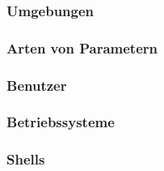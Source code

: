 \subsubsection{Umgebungen}
\subsubsection{Arten von Parametern}
\subsubsection{Benutzer}
\subsubsection{Betriebssysteme}
\subsubsection{Shells} 
